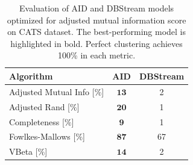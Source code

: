 \documentclass{article}
\begin{document}
\begin{enumerate}
        \begin{table}[htbp]
            \caption{Evaluation of AID and DBStream models optimized for adjusted mutual information score on CATS dataset. The best-performing model is highlighted in bold. Perfect clustering achieves 100\% in each metric.}
            \begin{center}
                \label{tab:perf_comp_cluster}
                \begin{tabular}{|l|c|c|}
                    \hline
                    \textbf{Algorithm}          & AID               & DBStream \\
                    \hline
                    Adjusted Mutual Info [$\%$] & $\boldsymbol{13}$ & 2        \\
                    \hline
                    Adjusted Rand [$\%$]        & $\boldsymbol{20}$ & 1        \\
                    \hline
                    Completeness [$\%$]         & $\boldsymbol{9}$ & 1       \\
                    \hline
                    Fowlkes-Mallows [$\%$]      & $\boldsymbol{87}$ & 67       \\
                    \hline
                    VBeta [$\%$]                & $\boldsymbol{14}$ & 2       \\
                    \hline
                \end{tabular}
            \end{center}
        \end{table}



\end{enumerate}
\end{document}
